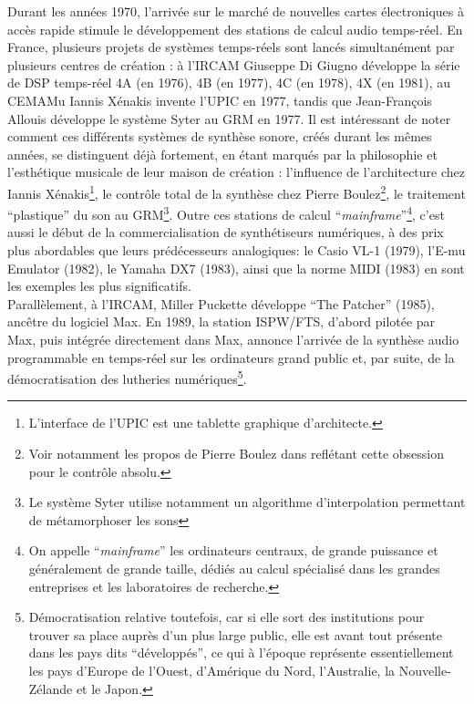 \indent Durant les années 1970, l'arrivée sur le marché de nouvelles cartes électroniques à accès rapide stimule le développement des stations de calcul audio temps-réel. En France, plusieurs projets de systèmes temps-réels sont lancés simultanément par plusieurs centres de création : à l'\gls{IRCAM} Giuseppe Di Giugno développe la série de \gls{DSP} temps-réel 4A (en 1976), 4B (en 1977), 4C (en 1978), 4X (en 1981), au \gls{CEMAMu} Iannis Xénakis invente l'\gls{UPIC} en 1977, tandis que Jean-François Allouis développe le système Syter \cite{teruggi_technology_2007} au \gls{GRM} en 1977. Il est intéressant de noter comment ces différents systèmes de synthèse sonore, créés durant les mêmes années, se distinguent déjà fortement, en étant marqués par la philosophie et l'esthétique musicale de leur maison de création : l'influence de l'architecture chez Iannis Xénakis\footnote{L'interface de l'\gls{UPIC} est une tablette graphique d'architecte.}, le contrôle total de la synthèse chez Pierre Boulez\footnote{Voir notamment les propos de Pierre Boulez dans \cite{albera_pli_2017} reflétant cette obsession pour le contrôle absolu.}, le traitement ``plastique'' du son au \gls{GRM}\footnote{Le système Syter utilise notamment un algorithme d'interpolation permettant de métamorphoser les sons}. Outre ces stations de calcul ``\textit{mainframe}''\footnote{On appelle ``\textit{mainframe}'' les ordinateurs centraux, de grande puissance et généralement de grande taille, dédiés au calcul spécialisé dans les grandes entreprises et les laboratoires de recherche.}, c'est aussi le début de la commercialisation de synthétiseurs numériques, à des prix plus abordables que leurs prédécesseurs analogiques: le Casio VL-1 (1979), l'E-mu Emulator (1982), le Yamaha DX7 (1983), ainsi que la norme \gls{MIDI} (1983) en sont les exemples les plus significatifs.\\
\indent Parallèlement, à l'\gls{IRCAM}, Miller Puckette développe ``The Patcher'' (1985), ancêtre du logiciel \gls{Max}. En 1989, la station \gls{ISPW}/\gls{FTS}, d'abord pilotée par \gls{Max}, puis intégrée directement dans \gls{Max}, annonce l'arrivée de la synthèse audio programmable en temps-réel sur les ordinateurs grand public et, par suite, de la démocratisation des lutheries numériques\footnote{Démocratisation relative toutefois, car si elle sort des institutions pour trouver sa place auprès d'un plus large public, elle est avant tout présente dans les pays dits ``développés'', ce qui à l'époque représente essentiellement les pays d'Europe de l'Ouest, d'Amérique du Nord, l'Australie, la Nouvelle-Zélande et le Japon.}.


